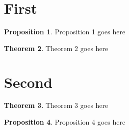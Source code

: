 \documentclass{article}
\theoremstyle{definition}
\newtheorem{nthm}{Theorem}[section]
\newtheorem{nprop}[nthm]{Proposition}
\begin{document}
\section{First}

\begin{nprop}
    Proposition 1 goes here
\end{nprop}

\begin{nthm}
    Theorem 2 goes here
\end{nthm}

\section{Second}

\begin{nthm}
    Theorem 3 goes here
\end{nthm}

\begin{nprop}
    Proposition 4 goes here
\end{nprop}
\end{document}
